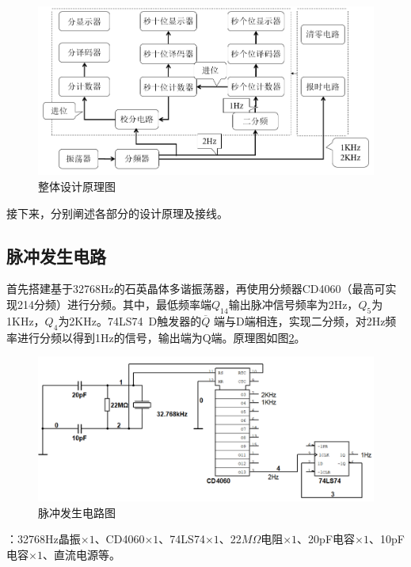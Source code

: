 \documentclass[12pt]{article}
\begin{document}
\begin{figure}[h]
\centering
\includegraphics[width=\textwidth]{TIM20180920124456.png}
\caption{整体设计原理图}
  \label{fig:zhentitu}
\end{figure}
接下来，分别阐述各部分的设计原理及接线。
\subsection{脉冲发生电路}\label{begin}
首先搭建基于32768Hz的石英晶体多谐振荡器，再使用分频器CD4060（最高可实现214分频）进行分频。其中，最低频率端$Q_{14}$输出脉冲信号频率为2Hz，$Q_5$为1KHz，$Q_4$为2KHz。74LS74\ D触发器的$\overline{Q}$ 端与D端相连，实现二分频，对2Hz频率进行分频以得到1Hz的信号，输出端为Q端。原理图如图\ref{fig:maichong}。
\begin{figure}[h]
\centering
\includegraphics[width=\textwidth]{TIM20180923143758.png}
\caption{脉冲发生电路图}
  \label{fig:maichong}
\end{figure}
：32768Hz晶振$\times1$、CD4060$\times1$、74LS74$\times1$、22$M\Omega$电阻$\times1$、20pF电容$\times1$、10pF电容$\times1$、直流电源等。
\end{document}
